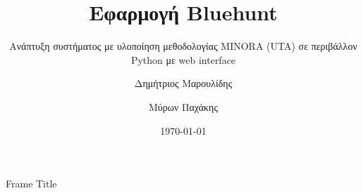 \documentclass{beamer}
\title{Εφαρμογή Bluehunt}
\subtitle{Ανάπτυξη συστήματος με υλοποίηση μεθοδολογίας MINORA (UTA) σε περιβάλλον Python με web interface}
\author{Δημήτριος Μαρουλίδης \and Μύρων Παχάκης}
\institute{Πολυτεχνείο Κρήτης}
\date{\today}
\begin{document}
\begin{frame}[plain]
    \maketitle
\end{frame}
\begin{frame}{Frame Title}
\end{frame}
\end{document}
